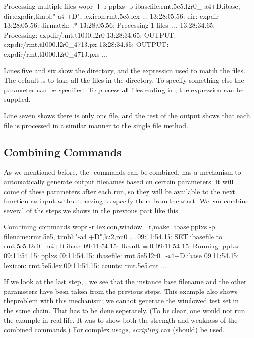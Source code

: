 \documentclass[a4paper,10pt,twoside]{report}
\begin{document}
\begin{bash}{Processing multiple files}
wopr -l -r pplxs -p ibasefile:rmt.5e5.l2r0_-a4+D.ibase,
                    dir:expdir,timbl:"-a4 +D",
                    lexicon:rmt.5e5.lex
...
13:28:05.56:  dir:             expdir
13:28:05.56:  dirmatch:        .*
13:28:05.56: Processing 1 files.
...
13:28:34.65: Processing: expdir/rmt.t1000.l2r0
13:28:34.65: OUTPUT:     expdir/rmt.t1000.l2r0_4713.px
13:28:34.65: OUTPUT:     expdir/rmt.t1000.l2r0_4713.pxs
...
\end{bash}

Lines five and six show the directory, and the expression used to
match the files. The default is to take all the files in the
directory. To specify something else the parameter  can
be specified. To process all files ending in , the
expression  can be supplied.

Line seven shows there is only one file, and the rest of the output
shows that each file is processed in a similar manner to the single
file method.

\subsection{Combining Commands}

As we mentioned before, the \wopr{}-commands can be combined. \Wopr{}
has a mechanism to automatically generate output filenames based on
certain parameters. It will  come of these parameters after
each run, so they will be available to the next function as input
without having to specify them from the start. We can combine several
of the steps we shows in the previous part like this.

\begin{bash}{Combining commands}
wopr -r lexicon,window_lr,make_ibase,pplxs -p filename:rmt.5e5,
                                              timbl:"-a4 +D",lc:2,rc:0
...
09:11:54.15: SET ibasefile to rmt.5e5.l2r0_-a4+D.ibase
09:11:54.15: Result = 0
09:11:54.15: Running: pplxs
09:11:54.15: pplxs
09:11:54.15:  ibasefile:      rmt.5e5.l2r0_-a4+D.ibase
09:11:54.15:  lexicon:        rmt.5e5.lex
09:11:54.15:  counts:         rmt.5e5.cnt
...
\end{bash}

If we look at the last step, , we see that the instance
base filename and the other parameters have been taken from the
previous steps. This example also shows theproblem with this
mechanism; we cannot generate the windowed test set in the same
chain. That has to be done seperately. (To be clear, one would not run
the example in real life. It was to show both the strength and
weakness of the combined commands.) For complex \wopr{} usage,
\emph{scripting} can (should) be used.
\end{document}
